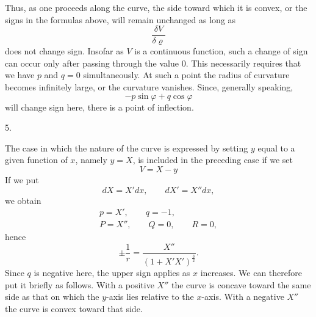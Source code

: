 \par{}%
\noindent\hspace*{1.2em}Thus, as one proceeds along the curve, the side toward which it is convex, or the signs in the formulas above, will remain unchanged as long as
\[
\frac{\delta V}{\delta\varrho}
\]
does not change sign. Insofar as $V$ is a continuous function, such a change of sign can occur only after passing through the value $0$. This necessarily requires that we have $p$ and $q=0$ simultaneously. At such a point the radius of curvature becomes infinitely large, or the curvature vanishes. Since, generally speaking,
\[
-p\sin\varphi+q\cos\varphi
\]
will change sign here, there is a point of inflection.

\begin{center}5.\end{center}
\noindent\hspace*{1.2em}The case in which the nature of the curve is expressed by setting $y$ equal to a given function of $x$, namely $y=X$, is included in the preceding case if we set
\[
V=X-y
\]
If we put
\[
dX=X'dx,\qquad dX'=X''dx,
\]
we obtain
\[
\begin{gathered}
p=X',\qquad q=-1,\\
P=X'',\qquad Q=0,\qquad R=0,
\end{gathered}
\]
hence
\[
\pm\frac1r=\frac{X''}{(1+X'X')^{\frac32}}.
\]
Since $q$ is negative here, the upper sign applies as $x$ increases. We can therefore put it briefly as follows. With a positive $X''$ the curve is concave toward the same side as that on which the $y$-axis lies relative to the $x$-axis. With a negative $X''$ the curve is convex toward that side.
